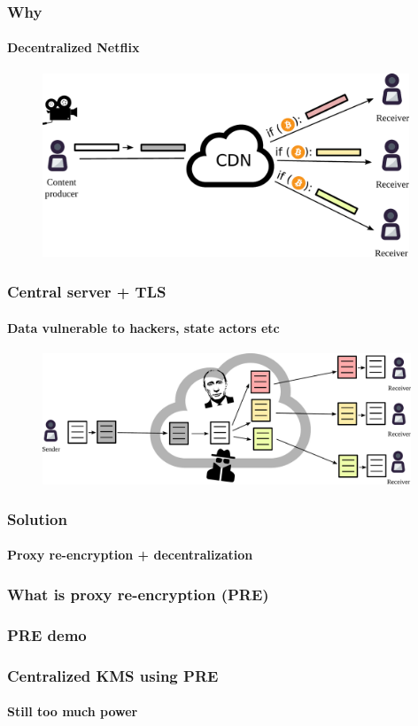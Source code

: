 \documentclass[xetex,mathsans,sans]{beamer}
\begin{document}
    \begin{frame}
        \frametitle{Why}
        \framesubtitle{Decentralized Netflix}
        \begin{figure}
            \centering
            \includegraphics[height=5.5cm]{pdf/streams.pdf}
        \end{figure}
    \end{frame}

    \begin{frame}
        \frametitle{Central server + TLS}
        \framesubtitle{Data vulnerable to hackers, state actors etc}
        \begin{figure}
            \centering
            \includegraphics[width=11cm]{pdf/file-sharing-tls.pdf}
        \end{figure}
    \end{frame}

    \begin{frame}
        \frametitle{Solution}
        \framesubtitle{Proxy re-encryption + decentralization}
    \end{frame}

    \begin{frame}
        \frametitle{What is proxy re-encryption (PRE)}
    \end{frame}

    \begin{frame}
        \frametitle{PRE demo}
    \end{frame}

    \begin{frame}
        \frametitle{Centralized KMS using PRE}
        \framesubtitle{Still too much power}
    \end{frame}
\end{document}
